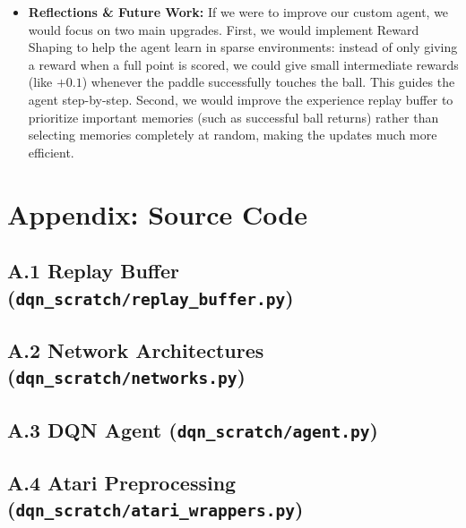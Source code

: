 \documentclass[12pt]{article}
\begin{document}
\begin{itemize}
  \item \textbf{Reflections \& Future Work:} 
    If we were to improve our custom agent, we would focus on two main upgrades. First, we would implement Reward Shaping to help the agent learn in sparse environments: instead of only giving a reward when a full point is scored, we could give small intermediate rewards (like $+0.1$) whenever the paddle successfully touches the ball. This guides the agent step-by-step. Second, we would improve the experience replay buffer to prioritize important memories (such as successful ball returns) rather than selecting memories completely at random, making the updates much more efficient.
\end{itemize}





\clearpage
\appendix
\section*{Appendix: Source Code}

\subsection*{A.1 Replay Buffer (\texttt{dqn\_scratch/replay\_buffer.py})}


\subsection*{A.2 Network Architectures (\texttt{dqn\_scratch/networks.py})}


\subsection*{A.3 DQN Agent (\texttt{dqn\_scratch/agent.py})}


\subsection*{A.4 Atari Preprocessing (\texttt{dqn\_scratch/atari\_wrappers.py})}

\end{document}
